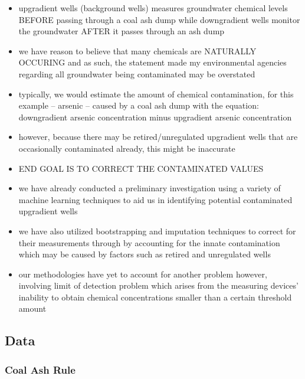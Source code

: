 \documentclass[
]{article}
\begin{document}
\begin{itemize}
\item
  upgradient wells (background wells) measures groundwater chemical
  levels BEFORE passing through a coal ash dump while downgradient wells
  monitor the groundwater AFTER it passes through an ash dump
\item
  we have reason to believe that many chemicals are NATURALLY OCCURING
  and as such, the statement made my environmental agencies regarding
  all groundwater being contaminated may be overstated
\item
  typically, we would estimate the amount of chemical contamination, for
  this example -- arsenic -- caused by a coal ash dump with the
  equation: downgradient arsenic concentration minus upgradient arsenic
  concentration
\item
  however, because there may be retired/unregulated upgradient wells
  that are occasionally contaminated already, this might be inaccurate
\end{itemize}

\begin{itemize}
\item
  END GOAL IS TO CORRECT THE CONTAMINATED VALUES
\item
  we have already conducted a preliminary investigation using a variety
  of machine learning techniques to aid us in identifying potential
  contaminated upgradient wells
\item
  we have also utilized bootstrapping and imputation techniques to
  correct for their measurements through by accounting for the innate
  contamination which may be caused by factors such as retired and
  unregulated wells
\item
  our methodologies have yet to account for another problem however,
  involving limit of detection problem which arises from the measuring
  devices' inability to obtain chemical concentrations smaller than a
  certain threshold amount
\end{itemize}

\hypertarget{data}{%
\subsection{Data}\label{data}}

\hypertarget{coalashrule}{%
\subsubsection{Coal Ash Rule}\label{coalashrule}}
\end{document}
